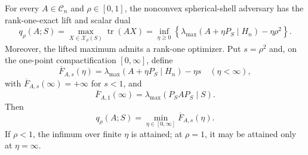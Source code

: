 For every \(A\in\mathcal C_n\) and \(\rho\in[0,1]\), the nonconvex spherical-shell adversary has the rank-one-exact lift and scalar dual
\[
q_\rho(A;S)=\max_{X\in\mathcal X_\rho(S)}\operatorname{tr}(AX)
=\inf_{\eta\geq0}\left\{\lambda_{\max}(A+\eta P_S\mid H_n)-\eta\rho^2\right\}.
\]
Moreover, the lifted maximum admits a rank-one optimizer. Put \(s=\rho^2\) and, on the one-point compactification \([0,\infty]\), define
\[
\overline F_{A,s}(\eta)=\lambda_{\max}(A+\eta P_S\mid H_n)-\eta s
\quad(\eta<\infty),
\]
with \(\overline F_{A,s}(\infty)=+\infty\) for \(s<1\), and
\[
\overline F_{A,1}(\infty)=\lambda_{\max}(P_SAP_S\mid S).
\]
Then
\[
q_\rho(A;S)=\min_{\eta\in[0,\infty]}\overline F_{A,s}(\eta).
\]
If \(\rho<1\), the infimum over finite \(\eta\) is attained; at \(\rho=1\), it may be attained only at \(\eta=\infty\).